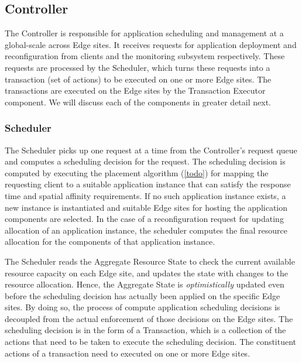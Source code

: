 \subsection{Controller}
The Controller is responsible for application scheduling and management at a global-scale across Edge sites. It receives requests for application deployment and reconfiguration from clients and the monitoring subsystem respectively. These requests are processed by the Scheduler, which turns these requests into a transaction (set of actions) to be executed on one or more Edge sites. The transactions are executed on the Edge sites by the Transaction Executor component. We will discuss each of the components in greater detail next.
\subsubsection{Scheduler}
\label{sec:scheduler}
The Scheduler picks up one request at a time from the Controller's request queue and computes a scheduling decision for the request. The scheduling decision is computed by executing the placement algorithm (\cref{todo}) for mapping the requesting client to a suitable application instance that can satisfy the response time and spatial affinity requirements. If no such application instance exists, a new instance is instantiated and suitable Edge sites for hosting the application components are selected. In the case of a reconfiguration request for updating allocation of an application instance, the scheduler computes the final resource allocation for the components of that application instance.
\par The Scheduler reads the Aggregate Resource State to check the current available resource capacity on each Edge site, and updates the state with changes to the resource allocation. Hence, the Aggregate State is \textit{optimistically} updated even before the scheduling decision has actually been applied on the specific Edge sites. By doing so, the process of compute application scheduling decisions is decoupled from the actual enforcement of those decisions on the Edge sites. The scheduling decision is in the form of a Transaction, which is a collection of the actions that need to be taken to execute the scheduling decision. The constituent actions of a transaction need to executed on one or more Edge sites. 

